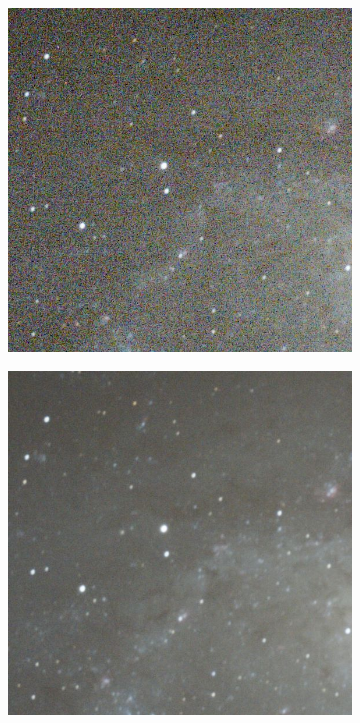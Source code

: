 \begin{figure}[!htb]
	\centering
	\caption{Efeito da combinação de imagens. (a) Imagem Original e (b) Empilhamento de 32 imagens}
	\captionsetup[subfigure]{justification=centering}
	\begin{subfigure}[b]{0.49\textwidth}
		\centering
		\includegraphics[width=\textwidth]{figuras/revisaobiblio/Stack_1}
		\caption{}
		\label{noCalibration}
	\end{subfigure}
 	\hfill
 	\begin{subfigure}[b]{0.49\textwidth}
 		\centering
	 	\includegraphics[width=\textwidth]{figuras/revisaobiblio/Stack_32}
	 	\caption{}
	 	\label{withCalibration}
	 \end{subfigure}

\end{figure}


